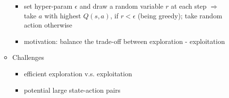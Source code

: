 \begin{itemize}
\begin{itemize}
		\begin{itemize}
		\item set hyper-param $\epsilon$ and draw a random variable $r$ at each step
		$\Rightarrow$ take $a$ with highest $Q(s, a)$, if $r<\epsilon$ (being greedy); take random action otherwise %
		\item motivation: balance the trade-off between exploration - exploitation
		\end{itemize}
	\item Challenges
		\begin{itemize}
		\item efficient exploration v.s. exploitation
		\item potential large state-action pairs
		\end{itemize}
	\end{itemize}
\end{itemize}

